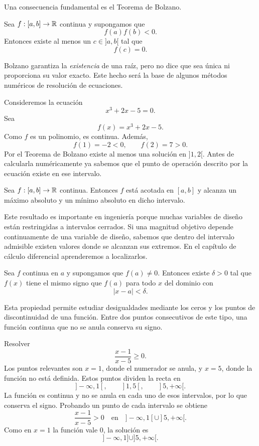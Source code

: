 Una consecuencia fundamental es el Teorema de Bolzano.

\begin{theorem}
Sea $f:[a,b]\to\mathbb{R}$ continua y supongamos que
\[
f(a)f(b)<0.
\]
Entonces existe al menos un $c\in]a,b[$ tal que
\[
f(c)=0.
\]
\end{theorem}

Bolzano garantiza la \emph{existencia} de una raíz, pero no dice que sea única ni proporciona su valor exacto. Este hecho será la base de algunos métodos numéricos de resolución de ecuaciones.

\begin{example}
Consideremos la ecuación
\[
x^3+2x-5=0.
\]
Sea
\[
f(x)=x^3+2x-5.
\]
Como $f$ es un polinomio, es continua. Además,
\[
f(1)=-2<0,
\qquad
f(2)=7>0.
\]
Por el Teorema de Bolzano existe al menos una solución en $]1,2[$. Antes de calcularla numéricamente ya sabemos que el punto de operación descrito por la ecuación existe en ese intervalo.
\end{example}

\begin{theorem}
Sea $f:[a,b]\to\mathbb{R}$ continua. Entonces $f$ está acotada en $[a,b]$ y alcanza un máximo absoluto y un mínimo absoluto en dicho intervalo.
\end{theorem}

Este resultado es importante en ingeniería porque muchas variables de diseño están restringidas a intervalos cerrados. Si una magnitud objetivo depende continuamente de una variable de diseño, sabemos que dentro del intervalo admisible existen valores donde se alcanzan sus extremos. En el capítulo de cálculo diferencial aprenderemos a localizarlos.

\begin{theorem}
Sea $f$ continua en $a$ y supongamos que $f(a)\neq0$. Entonces existe $\delta>0$ tal que $f(x)$ tiene el mismo signo que $f(a)$ para todo $x$ del dominio con
\[
|x-a|<\delta.
\]
\end{theorem}

Esta propiedad permite estudiar desigualdades mediante los ceros y los puntos de discontinuidad de una función. Entre dos puntos consecutivos de este tipo, una función continua que no se anula conserva su signo.

\begin{example}
Resolver
\[
\frac{x-1}{x-5}\geq0.
\]
Los puntos relevantes son $x=1$, donde el numerador se anula, y $x=5$, donde la función no está definida. Estos puntos dividen la recta en
\[
]-\infty,1[,\qquad ]1,5[,\qquad ]5,+\infty[.
\]
La función es continua y no se anula en cada uno de esos intervalos, por lo que conserva el signo. Probando un punto de cada intervalo se obtiene
\[
\frac{x-1}{x-5}>0\quad\text{en}\quad]-\infty,1[\cup]5,+\infty[.
\]
Como en $x=1$ la función vale $0$, la solución es
\[
]-\infty,1]\cup]5,+\infty[.
\]
\end{example}

